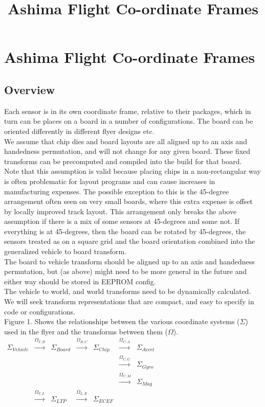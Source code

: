 \documentclass{article}
\begin{document}
\title{Ashima Flight Co-ordinate Frames}
\section{Ashima Flight Co-ordinate Frames}
\subsection{Overview}
Each sensor is in its own coordinate frame, relative to their
packages, which in turn can be places on a board in a number of
configurations. The board can be oriented differently in different
flyer designs etc.
\\
We assume that chip dies and board layouts are all aligned up to
an axis and handedness permutation, and will not change for any
given board. These fixed transforms can be precomputed and compiled
into the build for that board.
\\
Note that this assumption is valid because placing chips in a
non-rectangular way is often problematic for layout programs and can
cause increases in manufacturing expenses. The possible exception
to this is the 45-degree arrangement often seen on very small boards,
where this extra expense is offset by locally improved track layout.
This arrangement only breaks the above assumption if there is a mix of
some sensors at 45-degrees and some not. If everything is at
45-degrees, then the board can be rotated by 45-degrees, the sensors
treated as on a square grid and the board orientation combined into the
generalized vehicle to board transform.
\\
The board to vehicle transform should be aligned up to an axis and
handedness permutation, but (as above) might need to be more general in the
future and either way should be stored in EEPROM config.
\\
The vehicle to world, and world transforms need to be dynamically calculated.
\\
We will seek transform representations that are compact, and easy to specify in code
or configurations.
\\
Figure 1. Shows the relationships between the various coordinate
systems ($\Sigma$) used in the flyer and the transforms between them ($\Omega$).
\\
$\begin{matrix}
\Sigma_{Vehicle} & \xrightarrow{\Omega_{V,B}} & \Sigma_{Board} & \xrightarrow{\Omega_{B,C}} &
  \Sigma_{Chip} & \xrightarrow{\Omega_{C,A}} & \Sigma_{Accel} \\
&&&&&\xrightarrow{\Omega_{C,G}} & \Sigma_{Gyro}\\
&&&&&\xrightarrow{\Omega_{C,M}} & \Sigma_{Mag}\\
&\xrightarrow{\Omega_{V,L}} & \Sigma_{LTP} & \xrightarrow{\Omega_{L,E}} & \Sigma_{ECEF}\\
\end{matrix}$\\
\end{document}
